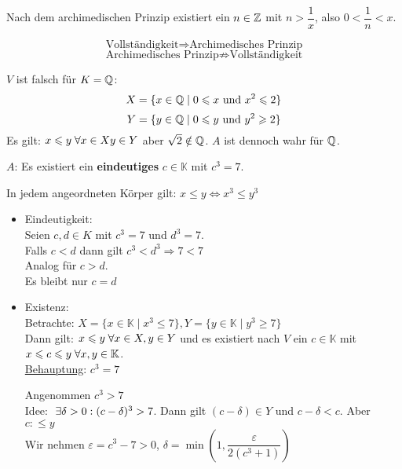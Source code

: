 \documentclass[main.tex]{subfiles}
\begin{document}
\begin{Beweis}
  Nach dem archimedischen Prinzip existiert ein $n\in \mathbb{Z}$ mit $n >\dfrac{1}{x}$, also $0 < \dfrac{1}{n} < x$.
\end{Beweis}

\begin{Theorem}
  $$\text{Vollständigkeit} \Rightarrow \text{Archimedisches Prinzip}$$
  $$\text{Archimedisches Prinzip} \not\Rightarrow \text{Vollständigkeit}$$
\end{Theorem}

\begin{Beweis}[Gegenbeispiel]
  $V$ ist falsch für $K=\mathbb{Q}$:
  $$X=\{x \in \mathbb{Q} \mid 0 \leqslant x \text{ und } x^2 \leqslant 2 \}$$
  $$Y=\{y \in \mathbb{Q} \mid 0 \leqslant y \text{ und } y^2 \geqslant 2 \}$$
  Es gilt: $x \leqslant y \;\forall x \in X y \in Y$ aber $\sqrt{2} \notin \mathbb{Q}$. $A$ ist dennoch wahr für $\mathbb{Q}$.
\end{Beweis}

\begin{Beispiel}
  $A$: Es existiert ein \textbf{eindeutiges} $c \in \mathbb{K}$ mit $c^3 = 7$.

  In jedem angeordneten Körper gilt: $x \leq y \Leftrightarrow x^3 \leq y^3$
  \begin{itemize}
    \item Eindeutigkeit:\\
    Seien $c,d \in K$ mit $c^3 =7$ und $d^3 =7$.\\
    Falls $c < d$ dann gilt $c^3 < d^3 \Rightarrow 7 < 7$ \lightning\\
    Analog für $c > d$.\\
    Es bleibt nur $c =d$
    \item Existenz:\\
    Betrachte: $X=\{x \in \mathbb{K} \mid x^3 \leq 7 \}, Y=\{y \in \mathbb{K} \mid y^3 \geq 7 \}$\\
    Dann gilt: $x\leqslant y \;\forall x \in X, y \in Y$ und es existiert nach $V$ ein $c \in \mathbb{K}$ mit $x\leqslant c \leqslant y \;\forall x,y \in \mathbb{K}$.\\
    \underline{Behauptung}: $c^3=7$
    \begin{Beweis}[$\adabs$]
      Angenommen $c^3 > 7$\\
      Idee: $\;\exists \delta > 0 : (c-\delta)^3> 7$. Dann gilt $(c-\delta) \in Y$ und $c-\delta < c$. Aber $c :\leq y$ \lightning\\
      Wir nehmen $\varepsilon = c^3 -7 > 0$, $\delta = \min\left(1,\dfrac{\varepsilon}{2(c^3+1)}\right)$
    \end{Beweis}
  \end{itemize}
\end{Beispiel}
\end{document}
